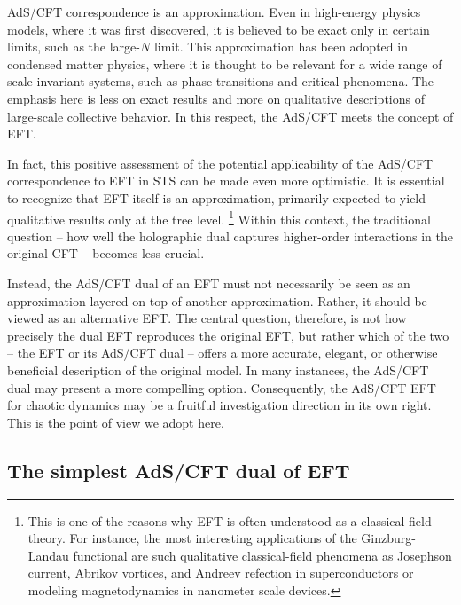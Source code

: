 \documentclass[final,5p,10pt,times,twocolumn,year]{elsarticle}
\begin{document}
AdS/CFT correspondence is an approximation. Even in high-energy physics models, where it was first discovered, it is believed to be exact only in certain limits, such as the large-$N$ limit. This approximation has been adopted in condensed matter physics, where it is thought to be relevant for a wide range of scale-invariant systems, such as phase transitions and critical phenomena. The emphasis here is less on exact results and more on qualitative descriptions of large-scale collective behavior. In this respect, the AdS/CFT meets the concept of EFT.

In fact, this positive assessment of the potential applicability of the AdS/CFT correspondence to EFT in STS can be made even more optimistic. It is essential to recognize that EFT itself is an approximation, primarily expected to yield qualitative results only at the tree level.%
\footnote{This is one of the reasons why EFT is often understood as a classical field theory. For instance, the most interesting applications of the Ginzburg-Landau functional are such qualitative classical-field phenomena as Josephson current, Abrikov vortices, and Andreev refection in superconductors or modeling magnetodynamics in nanometer scale devices.} 
Within this context, the traditional question -- how well the holographic dual captures higher-order interactions in the original CFT -- becomes less crucial.

Instead, the AdS/CFT dual of an EFT must not necessarily be seen as an approximation layered on top of another approximation. Rather, it should be viewed as an alternative EFT. The central question, therefore, is not how precisely the dual EFT reproduces the original EFT, but rather which of the two -- the EFT or its AdS/CFT dual -- offers a more accurate, elegant, or otherwise beneficial description of the original model. In many instances, the AdS/CFT dual may present a more compelling option. Consequently, the AdS/CFT EFT for chaotic dynamics may be a fruitful investigation direction in its own right. This is the point of view we adopt here.

\subsection{The simplest AdS/CFT dual of EFT}
\end{document}
